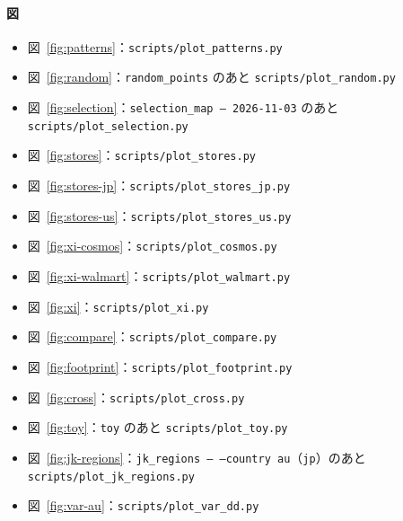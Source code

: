 \documentclass[a4paper,11pt]{ltjsarticle}
\newcommand{\code}[1]{\textcolor{codecolor}{\texttt{#1}}}
\begin{document}
\paragraph{図}
\begin{itemize}
  \item 図~\ref{fig:patterns}：\code{scripts/plot\_patterns.py}
  \item 図~\ref{fig:random}：\code{random\_points} のあと \code{scripts/plot\_random.py}
  \item 図~\ref{fig:selection}：\code{selection\_map -- 2026-11-03} のあと \code{scripts/plot\_selection.py}
  \item 図~\ref{fig:stores}：\code{scripts/plot\_stores.py}
  \item 図~\ref{fig:stores-jp}：\code{scripts/plot\_stores\_jp.py}
  \item 図~\ref{fig:stores-us}：\code{scripts/plot\_stores\_us.py}
  \item 図~\ref{fig:xi-cosmos}：\code{scripts/plot\_cosmos.py}
  \item 図~\ref{fig:xi-walmart}：\code{scripts/plot\_walmart.py}
  \item 図~\ref{fig:xi}：\code{scripts/plot\_xi.py}
  \item 図~\ref{fig:compare}：\code{scripts/plot\_compare.py}
  \item 図~\ref{fig:footprint}：\code{scripts/plot\_footprint.py}
  \item 図~\ref{fig:cross}：\code{scripts/plot\_cross.py}
  \item 図~\ref{fig:toy}：\code{toy} のあと \code{scripts/plot\_toy.py}
  \item 図~\ref{fig:jk-regions}：\code{jk\_regions -- --country au}（\code{jp}）のあと \code{scripts/plot\_jk\_regions.py}
  \item 図~\ref{fig:var-au}：\code{scripts/plot\_var\_dd.py}
\end{itemize}
\end{document}
